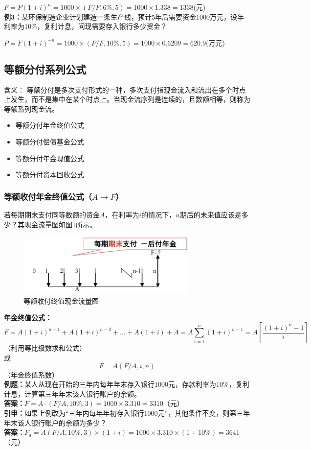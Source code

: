 $F=P(1+i)^n=1000 \times (F/P,6\%,5)=1000 \times 1.338=1338$(元)\\
\textbf{例3：}某环保制造企业计划建造一条生产线，预计5年后需要资金1000万元，设年利率为10\%，复利计息，问现需要存入银行多少资金？

$P=F(1+i)^{-n}=1000 \times (P/F,10\%,5)=1000 \times 0.6209=620.9$(万元)

\subsection{等额分付系列公式}

含义：
等额分付是多次支付形式的一种，多次支付指现金流入和流出在多个时点上发生，而不是集中在某个时点上。当现金流序列是连续的，且数额相等，则称为等额系列现金流。
\begin{itemize}
    \item 等额分付年金终值公式
    \item 等额分付偿债基金公式
    \item 等额分付年金现值公式
    \item 等额分付资本回收公式
\end{itemize}

\subsubsection{等额收付年金终值公式（$A \to F$）}

若每期期末支付同等数额的资金$A$，在利率为$i$的情况下，$n$期后的未来值应该是多少？其现金流量图如图\ref{fig:7}所示。

\begin{figure}[H]
    \centering
    \includegraphics[width=0.8\textwidth]{image/等额收付终值现金流量图.jpg}
    \caption{等额收付终值现金流量图}
    \label{fig:7}
\end{figure}

\noindent \textbf{年金终值公式：}
$$F=A(1+i)^{n-1}+A(1+i)^{n-2}+\mbox{…}+A(1+i)+A=A \sum_{i=1}^{n} (1+i)^{n-1}=A[\frac{(1+i)^n-1}{i}]$$（利用等比级数求和公式）\\
或
$$F = A(F / A, i, n)$$（年金终值系数）\\
\textbf{例题：}某人从现在开始的三年内每年年末存入银行1000元，存款利率为10\%，复利计息，计算第三年年末该人银行账户的余额。\\
\textbf{答案：}$F=A \cdot (F/A,10\%,3)=1000 \times 3.310 = 3310$（元）\\
\textbf{引申：}如果上例改为“三年内每年年初存入银行1000元”，其他条件不变，则第三年年末该人银行账户的余额为多少？\\
\textbf{答案：}$F_d=A(F/A,10\%,3) \times (1+i)=1000 \times 3.310 \times (1+10\%)=3641$（元）

